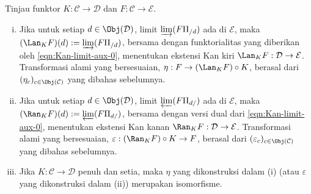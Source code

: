 \begin{teorema}\label{prop:Kan-limit}
	Tinjau funktor $K: \mathcal{C} \to \mathcal{D}$ dan
	$F: \mathcal{C} \to \mathcal{E}$.
	\begin{enumerate}[(i)]
		\item Jika untuk setiap $d \in \Obj(\mathcal{D})$, limit
		$\varinjlim (F \Pi_{/d})$ ada di $\mathcal{E}$, maka
		$(\Lan_K F)(d) := \varinjlim (F \Pi_{/d})$, bersama dengan
		funktorialitas yang diberikan oleh \eqref{eqn:Kan-limit-aux-0},
		menentukan ekstensi Kan kiri
		$\Lan_K F: \mathcal{D} \to \mathcal{E}$. Transformasi alami yang
		bersesuaian, $\eta: F \to (\Lan_K F) \circ K$, berasal dari
		$(\eta_c)_{c \in \Obj(\mathcal{C})}$ yang dibahas sebelumnya.
		\item Jika untuk setiap $d \in \Obj(\mathcal{D})$, limit
		$\varprojlim (F \Pi_{d/})$ ada di $\mathcal{E}$, maka
		$(\Ran_K F)(d) := \varprojlim (F \Pi_{d/})$, bersama dengan versi dual
		dari \eqref{eqn:Kan-limit-aux-0}, menentukan ekstensi Kan kanan
		$\Ran_K F: \mathcal{D} \to \mathcal{E}$. Transformasi alami yang
		bersesuaian, $\varepsilon: (\Ran_K F) \circ K \to F$, berasal dari
		$(\varepsilon_c)_{c \in \Obj(\mathcal{C})}$ yang dibahas sebelumnya.
		\item Jika $K: \mathcal{C} \to \mathcal{D}$ penuh dan setia, maka
		$\eta$ yang dikonstruksi dalam (i) (atau $\varepsilon$ yang dikonstruksi
		dalam (ii)) merupakan isomorfisme.
	\end{enumerate}
\end{teorema}
